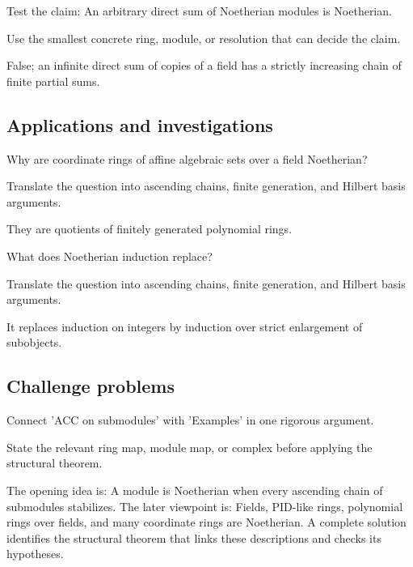 \begin{exercise}\label{exr:v15-expand-12}
Test the claim: An arbitrary direct sum of Noetherian modules is Noetherian.
\end{exercise}
\begin{hint}
Use the smallest concrete ring, module, or resolution that can decide the claim.
\end{hint}
\begin{solution}
False; an infinite direct sum of copies of a field has a strictly increasing chain of finite partial sums.
\end{solution}

\subsection*{Applications and investigations}

\begin{exercise}\label{exr:v15-expand-13}
Why are coordinate rings of affine algebraic sets over a field Noetherian?
\end{exercise}
\begin{hint}
Translate the question into ascending chains, finite generation, and Hilbert basis arguments.
\end{hint}
\begin{solution}
They are quotients of finitely generated polynomial rings.
\end{solution}

\begin{exercise}[Induction]\label{exr:v15-expand-14}
What does Noetherian induction replace?
\end{exercise}
\begin{hint}
Translate the question into ascending chains, finite generation, and Hilbert basis arguments.
\end{hint}
\begin{solution}
It replaces induction on integers by induction over strict enlargement of subobjects.
\end{solution}

\subsection*{Challenge problems}

\begin{exercise}\label{exr:v15-expand-15}
Connect 'ACC on submodules' with 'Examples' in one rigorous argument.
\end{exercise}
\begin{hint}
State the relevant ring map, module map, or complex before applying the structural theorem.
\end{hint}
\begin{solution}
The opening idea is: A module is Noetherian when every ascending chain of submodules stabilizes. The later viewpoint is: Fields, PID-like rings, polynomial rings over fields, and many coordinate rings are Noetherian. A complete solution identifies the structural theorem that links these descriptions and checks its hypotheses.
\end{solution}

